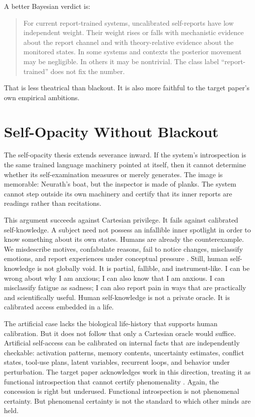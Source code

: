\documentclass[11pt]{article}
\begin{document}
A better Bayesian verdict is:

\begin{quote}
For current report-trained systems, uncalibrated self-reports have low independent weight. Their weight rises or falls with mechanistic evidence about the report channel and with theory-relative evidence about the monitored states. In some systems and contexts the posterior movement may be negligible. In others it may be nontrivial. The class label ``report-trained'' does not fix the number.
\end{quote}

That is less theatrical than blackout. It is also more faithful to the target paper's own empirical ambitions.

\section{Self-Opacity Without Blackout}

The self-opacity thesis extends severance inward. If the system's introspection is the same trained language machinery pointed at itself, then it cannot determine whether its self-examination measures or merely generates. The image is memorable: Neurath's boat, but the inspector is made of planks. The system cannot step outside its own machinery and certify that its inner reports are readings rather than recitations.

This argument succeeds against Cartesian privilege. It fails against calibrated self-knowledge. A subject need not possess an infallible inner spotlight in order to know something about its own states. Humans are already the counterexample. We misdescribe motives, confabulate reasons, fail to notice changes, misclassify emotions, and report experiences under conceptual pressure \citep{nisbettwilson,johansson,schwitzgebel2008}. Still, human self-knowledge is not globally void. It is partial, fallible, and instrument-like. I can be wrong about why I am anxious; I can also know that I am anxious. I can misclassify fatigue as sadness; I can also report pain in ways that are practically and scientifically useful. Human self-knowledge is not a private oracle. It is calibrated access embedded in a life.

The artificial case lacks the biological life-history that supports human calibration. But it does not follow that only a Cartesian oracle would suffice. Artificial self-access can be calibrated on internal facts that are independently checkable: activation patterns, memory contents, uncertainty estimates, conflict states, tool-use plans, latent variables, recurrent loops, and behavior under perturbation. The target paper acknowledges work in this direction, treating it as functional introspection that cannot certify phenomenality \citep{ownminds}. Again, the concession is right but underused. Functional introspection is not phenomenal certainty. But phenomenal certainty is not the standard to which other minds are held.
\end{document}
